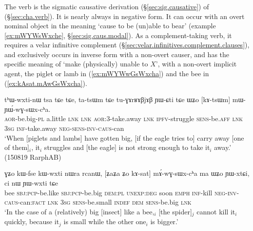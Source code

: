 \subsubsection{} \label{sec:sWxcha}
The verb  is the sigmatic causative derivation (§\ref{sec:sig.causative}) of  (§\ref{sec:cha.verb}). It is nearly always in negative form. It can occur with an overt nominal object in the meaning `cause to be (un)able to bear' (example \ref{ex:mWYWsWxche}, §\ref{sec:sig.caus.modal}). As a com\-ple\-ment-taking verb, it requires a velar infinitive complement (§\ref{sec:velar.infinitives.complement.clauses}), and exclusively occurs in inverse form with a non-overt causer, and has the specific meaning of `make (physically) unable to $X$', with a non-overt implicit agent, the piglet or lamb in (\ref{ex:mWYWwGsWxcha}) and the bee in (\ref{ex:kAsat.mAwGsWxcha}).

\begin{exe}
\ex \label{ex:mWYWwGsWxcha}
\gll tʰɯ-wxti-nɯ tsa tɕe tɕe, ta-tsɯm tɕe tu-ɣɤrʁɤβjɤβ ɲɯ-ɕti tɕe ɯʑo [kɤ-tsɯm] mɯ-ɲɯ́-wɣ-sɯx-cʰa. \\
\textsc{aor}-be.big-\textsc{pl} a.little \textsc{lnk}  \textsc{lnk} \textsc{aor}:3\flobv{}-take.away \textsc{lnk} \textsc{ipfv}-struggle \textsc{sens}-be.\textsc{aff}   \textsc{lnk} \textsc{3sg} \textsc{inf}-take.away \textsc{neg}-\textsc{sens}-\textsc{inv}-\textsc{caus}-can \\
\glt `When [piglets and lambs] have gotten big, [if the eagle tries to] carry away [one of them]$_i$, it$_i$ struggles and [the eagle] is not strong enough to take it$_i$ away.' (150819 RarphAB)
\end{exe}	

\begin{exe}
\ex \label{ex:kAsat.mAwGsWxcha}
\gll  ɣʑo kɯ-fse kɯ-wxti nɯra rcanɯ, [ʑaʑa ʑo kɤ-sat] mɤ́-wɣ-sɯx-cʰa ma ɯʑo ɲɯ-xtɕi, ci nɯ ɲɯ-wxti tɕe \\
bee \textsc{sbj}:\textsc{pcp}-be.like \textsc{sbj}:\textsc{pcp}-be.big \textsc{dem}:\textsc{pl} \textsc{unexp}:\textsc{deg} soon \textsc{emph} \textsc{inf}-kill \textsc{neg}-\textsc{inv}-\textsc{caus}-can:\textsc{fact} \textsc{lnk} \textsc{3sg} \textsc{sens}-be.small \textsc{indef} \textsc{dem} \textsc{sens}-be.big \textsc{lnk} \\
\glt `In the case of a (relatively) big [insect] like a bee,$_i$ [the spider]$_j$ cannot kill it$_i$ quickly, because it$_j$ is small while the other one$_i$ is bigger.' 
\end{exe}	

